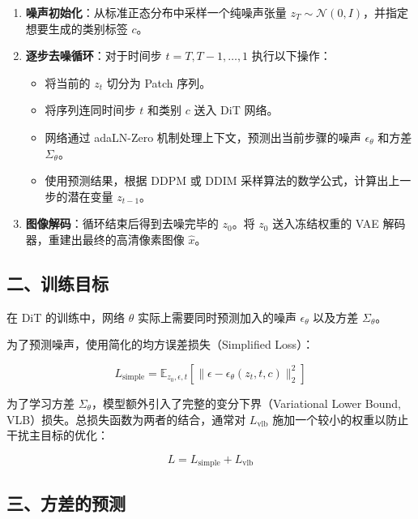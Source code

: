 \begin{enumerate}
\def\labelenumi{\arabic{enumi}.}
\tightlist
\item
  \textbf{噪声初始化}：从标准正态分布中采样一个纯噪声张量 \(z_T\sim\mathcal{N}(0,I)\)，并指定想要生成的类别标签 \(c\)。
\item
{}
  \textbf{逐步去噪循环}：对于时间步 \(t=T,T-1,\ldots,1\) 执行以下操作：

  \begin{itemize}
  \tightlist
  \item
    将当前的 \(z_t\) 切分为 Patch 序列。
  \item
    将序列连同时间步 \(t\) 和类别 \(c\) 送入 DiT 网络。
  \item
    网络通过 adaLN-Zero 机制处理上下文，预测出当前步骤的噪声 \(\epsilon_\theta\) 和方差 \(\Sigma_\theta\)。
  \item
    使用预测结果，根据 DDPM 或 DDIM 采样算法的数学公式，计算出上一步的潜在变量 \(z_{t-1}\)。
  \end{itemize}
\item
  \textbf{图像解码}：循环结束后得到去噪完毕的 \(z_0\)。将 \(z_0\) 送入冻结权重的 VAE 解码器，重建出最终的高清像素图像 \(\hat{x}\)。
\end{enumerate}

\hypertarget{ux4e8cux8badux7ec3ux76eeux6807}{%
\subsection{二、训练目标}\label{ux4e8cux8badux7ec3ux76eeux6807}}

在 DiT 的训练中，网络 \(\theta\) 实际上需要同时预测加入的噪声 \(\epsilon_\theta\) 以及方差 \(\Sigma_\theta\)。

为了预测噪声，使用简化的均方误差损失（Simplified Loss）：

\[
L_{\mathrm{simple}}=\mathbb{E}_{z_0,\epsilon,t}\left[\lVert \epsilon-\epsilon_\theta(z_t,t,c)\rVert_2^2\right]
\]

为了学习方差 \(\Sigma_\theta\)，模型额外引入了完整的变分下界（Variational Lower Bound, VLB）损失。总损失函数为两者的结合，通常对 \(L_{\mathrm{vlb}}\) 施加一个较小的权重以防止干扰主目标的优化：

\[
L=L_{\mathrm{simple}}+L_{\mathrm{vlb}}
\]

\hypertarget{ux4e09ux65b9ux5deeux7684ux9884ux6d4b}{%
\subsection{三、方差的预测}\label{ux4e09ux65b9ux5deeux7684ux9884ux6d4b}}

